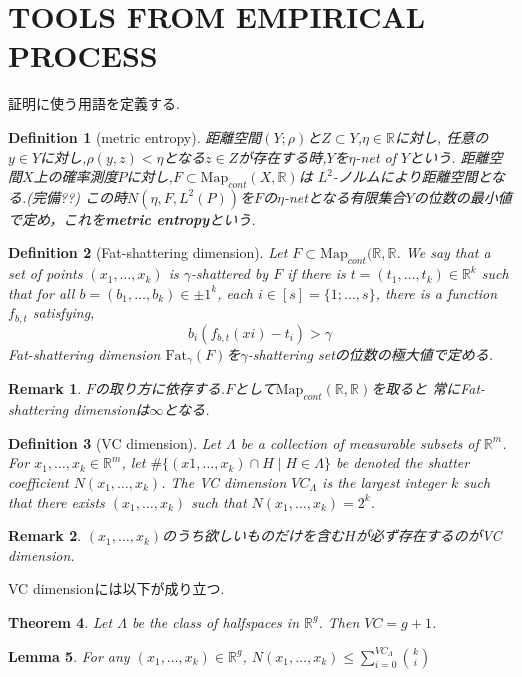 \documentclass{ujarticle}
\newtheorem{thm}{Theorem}[section]
\newtheorem{dfn}[thm]{Definition}
\newtheorem{lem}[thm]{Lemma}
\newtheorem*{rem}{Remark}
\begin{document}
\section{TOOLS FROM EMPIRICAL PROCESS}
\label{sec:TOOLS FROM EMPIRICAL PROCESS}
証明に使う用語を定義する.
\begin{dfn}[metric entropy]
 距離空間$(Y;\rho)$と$Z \subset Y$,$\eta \in \mathbb{R}$に対し,
 任意の$y \in Y$に対し,$\rho(y,z) <\eta$となる$z \in Z$が存在する時,$Y$を$\eta$-net of $Y$という.
 距離空間$X$上の確率測度$P$に対し,$F \subset \mathrm{Map}_{cont}(X,\mathbb{R})$は
 $L^2$-ノルムにより距離空間となる.(完備??)
 この時$N(\eta,F,L^2(P))$を$F$の$\eta$-netとなる有限集合$Y$の位数の最小値で定め，これを\textbf{metric entropy}という.
\end{dfn}

\begin{dfn}[Fat-shattering dimension]
  Let $F \subset \mathrm{Map}_{cont}(\mathbb{R},\mathbb{R}$.
  We say that a set of points $(x_1, \dots, x_k)$ is $\gamma$-shattered by $F$
  if there is $t = (t_1, \dots,t_k) \in \mathbb{R}^k$ such that for all
  $b = (b_1, \dots,b_k) \in {\pm 1}^k$, each $i \in [s]= \{1; \dots,s\}$,
   there is a function $f_{b,t}$ satisfying,
   \begin{equation*}
     b_i (f_{b,t}(xi) - t_i) >  \gamma
   \end{equation*}
  Fat-shattering dimension $\mathrm{Fat}_{\gamma}(F)$を$\gamma$-shattering setの位数の極大値で定める.
\end{dfn}
\begin{rem}
 $F$の取り方に依存する.$F$として$\mathrm{Map}_{cont}(\mathbb{R},\mathbb{R})$を取ると
 常にFat-shattering dimensionは$\infty$となる.
\end{rem}

\begin{dfn}[VC dimension]
Let $\Lambda$ be a collection of measurable subsets of $\mathbb{R}^m$.
For $x_1,\dots,x_k \in \mathbb{R}^m$,
let $\#\{(x1, \dots ,x_k) \cap H \mid H \in \Lambda\}$ be denoted the shatter coefficient $N(x_1, \dots, x_k)$.
The VC dimension $VC_{\Lambda}$
is the largest integer $k$ such that there exists $(x_1, \dots,x_k)$ such that $N(x_1,\dots, x_k) = 2^k$.
\end{dfn}
\begin{rem}
 $(x_1,\dots,x_k)$のうち欲しいものだけを含む$H$が必ず存在するのがVC dimension.
\end{rem}
VC dimensionには以下が成り立つ.
\begin{thm}
 Let $\Lambda$ be the class of halfspaces in $\mathbb{R}^g$. Then $VC= g + 1$.
\end{thm}
\begin{lem}
  For any $(x_1,\dots, x_k) \in  \mathbb{R}^g$,
  $N(x_1,\dots, x_k)  \le \sum_{i=0}^{VC_{\Lambda}}  \binom{k}{i}$
\end{lem}
\end{document}
